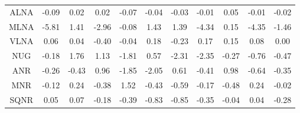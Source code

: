 \begin{longtable}{ | c || c | c | c | c | c | c | c | c | c || c |}
ALNA &  \cellcolor[HTML]{FFFFFF} -0.09 &  \cellcolor[HTML]{FFFFFF} 0.02 &  \cellcolor[HTML]{FFFFFF} 0.02 &  \cellcolor[HTML]{FFFFFF} -0.07 &  \cellcolor[HTML]{FFFFFF} -0.04 &  \cellcolor[HTML]{FFFFFF} -0.03 &  \cellcolor[HTML]{FFFFFF} -0.01 &  \cellcolor[HTML]{FFFFFF} 0.05 &  \cellcolor[HTML]{FFFFFF} -0.01 &  \cellcolor[HTML]{FFFFFF} -0.02 \\
MLNA &  \cellcolor[HTML]{FF7070} -5.81 &  \cellcolor[HTML]{DFDFFF} 1.41 &  \cellcolor[HTML]{FFB7B7} -2.96 &  \cellcolor[HTML]{FFFFFF} -0.08 &  \cellcolor[HTML]{DFDFFF} 1.43 &  \cellcolor[HTML]{DFDFFF} 1.39 &  \cellcolor[HTML]{FF8F8F} -4.34 &  \cellcolor[HTML]{FFFFFF} 0.15 &  \cellcolor[HTML]{FF8F8F} -4.35 &  \cellcolor[HTML]{FFD7D7} -1.46 \\
VLNA &  \cellcolor[HTML]{FFFFFF} 0.06 &  \cellcolor[HTML]{FFFFFF} 0.04 &  \cellcolor[HTML]{FFF7F7} -0.40 &  \cellcolor[HTML]{FFFFFF} -0.04 &  \cellcolor[HTML]{F7F7FF} 0.18 &  \cellcolor[HTML]{FFF7F7} -0.23 &  \cellcolor[HTML]{F7F7FF} 0.17 &  \cellcolor[HTML]{FFFFFF} 0.15 &  \cellcolor[HTML]{FFFFFF} 0.08 &  \cellcolor[HTML]{FFFFFF} 0.00 \\
NUG &  \cellcolor[HTML]{FFF7F7} -0.18 &  \cellcolor[HTML]{CFCFFF} 1.76 &  \cellcolor[HTML]{DFDFFF} 1.13 &  \cellcolor[HTML]{FFCFCF} -1.81 &  \cellcolor[HTML]{EFEFFF} 0.57 &  \cellcolor[HTML]{FFC7C7} -2.31 &  \cellcolor[HTML]{FFC7C7} -2.35 &  \cellcolor[HTML]{FFF7F7} -0.27 &  \cellcolor[HTML]{FFEFEF} -0.76 &  \cellcolor[HTML]{FFF7F7} -0.47 \\
ANR &  \cellcolor[HTML]{FFF7F7} -0.26 &  \cellcolor[HTML]{FFF7F7} -0.43 &  \cellcolor[HTML]{E7E7FF} 0.96 &  \cellcolor[HTML]{FFCFCF} -1.85 &  \cellcolor[HTML]{FFCFCF} -2.05 &  \cellcolor[HTML]{EFEFFF} 0.61 &  \cellcolor[HTML]{FFF7F7} -0.41 &  \cellcolor[HTML]{E7E7FF} 0.98 &  \cellcolor[HTML]{FFEFEF} -0.64 &  \cellcolor[HTML]{FFF7F7} -0.35 \\
MNR &  \cellcolor[HTML]{FFFFFF} -0.12 &  \cellcolor[HTML]{F7F7FF} 0.24 &  \cellcolor[HTML]{FFF7F7} -0.38 &  \cellcolor[HTML]{D7D7FF} 1.52 &  \cellcolor[HTML]{FFF7F7} -0.43 &  \cellcolor[HTML]{FFEFEF} -0.59 &  \cellcolor[HTML]{FFF7F7} -0.17 &  \cellcolor[HTML]{FFEFEF} -0.48 &  \cellcolor[HTML]{F7F7FF} 0.24 &  \cellcolor[HTML]{FFFFFF} -0.02 \\
SQNR &  \cellcolor[HTML]{FFFFFF} 0.05 &  \cellcolor[HTML]{FFFFFF} 0.07 &  \cellcolor[HTML]{FFF7F7} -0.18 &  \cellcolor[HTML]{FFF7F7} -0.39 &  \cellcolor[HTML]{FFE7E7} -0.83 &  \cellcolor[HTML]{FFE7E7} -0.85 &  \cellcolor[HTML]{FFF7F7} -0.35 &  \cellcolor[HTML]{FFFFFF} -0.04 &  \cellcolor[HTML]{FFFFFF} 0.04 &  \cellcolor[HTML]{FFF7F7} -0.28 \\

\end{longtable}
